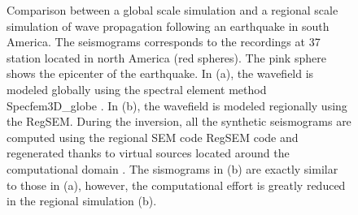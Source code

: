 \documentclass[12pt]{article}
\begin{document}
\begin{figure}[p]
	\caption{\baselineskip 18pt 
		Comparison between a global scale simulation and a regional scale simulation of wave propagation following an earthquake in south America. The seismograms corresponds to the recordings at 37 station located in north America (red spheres).
		The pink sphere shows the epicenter of the earthquake. In (a), the wavefield is modeled globally using the spectral element method Specfem3D\_globe \citep{komatitsch2002spectrala}. In (b), the wavefield is modeled regionally using the RegSEM. During the inversion, all the synthetic seismograms are computed using the regional SEM code RegSEM \citep{cupillard2012regsem} code and regenerated thanks to virtual sources located around the computational domain \citep[see][]{masson2013numerical}. The sismograms in (b) are exactly similar to those in (a), however, the computational effort is greatly reduced in the regional simulation (b).}

	\label{injection}

\end{figure}
\end{document}
